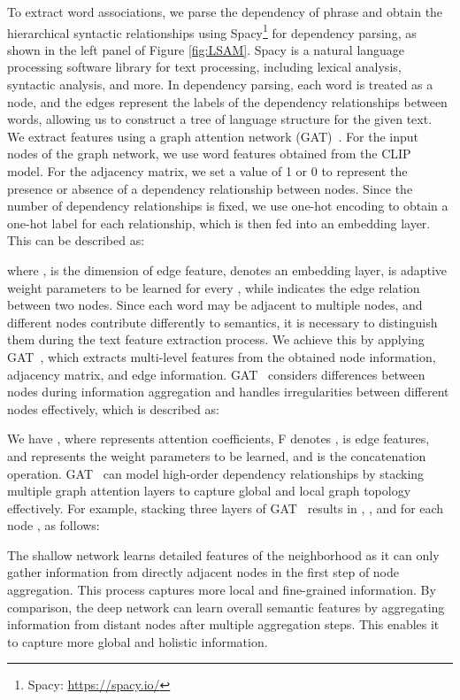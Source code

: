 \documentclass[10pt,twocolumn,letterpaper]{article}
\begin{document}
To extract word associations, we parse the dependency of phrase and obtain the hierarchical syntactic relationships using Spacy\footnote{Spacy: \url{https://spacy.io/}} for dependency parsing, as shown in the left panel of Figure \ref{fig:LSAM}. Spacy is a natural language processing software library for text processing, including lexical analysis, syntactic analysis, and more. In dependency parsing, each word is treated as a node, and the edges represent the labels of the dependency relationships between words, allowing us to construct a tree of language structure for the given text. We extract features using a graph attention network (GAT)~\cite{velivckovic2017graph}. For the input nodes of the graph network, we use word features obtained from the CLIP~\cite{radford2021learning} model. For the adjacency matrix, we set a value of 1 or 0 to represent the presence or absence of a dependency relationship between nodes. Since the number of dependency relationships is fixed, we use one-hot encoding to obtain a one-hot label for each relationship, which is then fed into an embedding layer. This can be described as:

where ,  is the dimension of edge feature,  denotes an embedding layer,  is adaptive weight parameters to be learned for every , while  indicates the edge relation between two nodes.
Since each word may be adjacent to multiple nodes, and different nodes contribute differently to semantics, it is necessary to distinguish them during the text feature extraction process.
We achieve this by applying GAT~\cite{velivckovic2017graph}, which extracts multi-level features from the obtained node information, adjacency matrix, and edge information. GAT~\cite{velivckovic2017graph} considers differences between nodes during information aggregation and handles irregularities between different nodes effectively, which is described as:



We have , where  represents attention coefficients, F denotes ,  is edge features,  and  represents the weight parameters to be learned, and  is the concatenation operation. GAT~\cite{velivckovic2017graph} can model high-order dependency relationships by stacking multiple graph attention layers to capture global and local graph topology effectively. For example, stacking three layers of GAT~\cite{velivckovic2017graph} results in , , and  for each node , as follows:




The shallow network  learns detailed features of the neighborhood as it can only gather information from directly adjacent nodes in the first step of node aggregation. This process captures more local and fine-grained information. By comparison, the deep network  can learn overall semantic features by aggregating information from distant nodes after multiple aggregation steps. This enables it to capture more global and holistic information.
\end{document}
